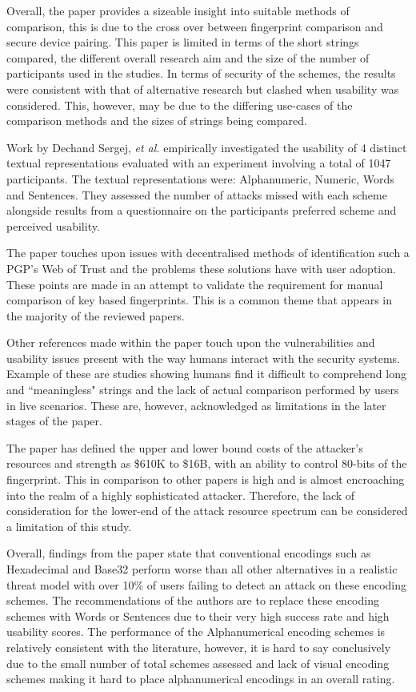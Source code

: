 Overall, the paper provides a sizeable insight into suitable methods of comparison, this is due to the cross over between fingerprint comparison and secure device pairing. This paper is limited in terms of the short strings compared, the different overall research aim and the size of the number of participants used in the studies. In terms of security of the schemes, the results were consistent with that of alternative research but clashed when usability was considered. This, however, may be due to the differing use-cases of the comparison methods and the sizes of strings being compared.

Work by Dechand Sergej, \textit{et al.}\cite{dechand2016empirical} empirically investigated the usability of 4 distinct textual representations evaluated with an experiment involving a total of 1047 participants. The textual representations were: Alphanumeric, Numeric, Words and Sentences. They assessed the number of attacks missed with each scheme alongside results from a questionnaire on the participants preferred scheme and perceived usability.

The paper touches upon issues with decentralised methods of identification such a PGP's Web of Trust and the problems these solutions have with user adoption. These points are made in an attempt to validate the requirement for manual comparison of key based fingerprints. This is a common theme that appears in the majority of the reviewed papers.

Other references made within the paper touch upon the vulnerabilities and usability issues present with the way humans interact with the security systems. Example of these are studies showing humans find it difficult to comprehend long and ``meaningless" strings and the lack of actual comparison performed by users in live scenarios. These are, however, acknowledged as limitations in the later stages of the paper.

The paper has defined the upper and lower bound costs of the attacker's resources and strength as \$610K to \$16B, with an ability to control 80-bits of the fingerprint. This in comparison to other papers is high and is almost encroaching into the realm of a highly sophisticated attacker. Therefore, the lack of consideration for the lower-end of the attack resource spectrum can be considered a limitation of this study.

Overall, findings from the paper state that conventional encodings such as Hexadecimal and Base32 perform worse than all other alternatives in a realistic threat model with over 10\% of users failing to detect an attack on these encoding schemes. The recommendations of the authors are to replace these encoding schemes with Words or Sentences due to their very high success rate and high usability scores. The performance of the Alphanumerical encoding schemes is relatively consistent with the literature, however, it is hard to say conclusively due to the small number of total schemes assessed and lack of visual encoding schemes making it hard to place alphanumerical encodings in an overall rating.

